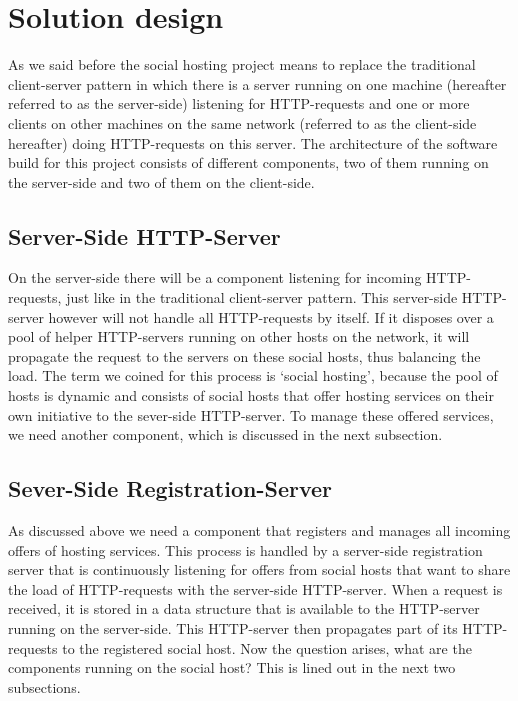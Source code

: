\documentclass[a4paper, 10pt]{article}
\begin{document}
\section{Solution design}

As we said before the social hosting project means to replace the traditional client-server pattern in which there is a server running on one machine (hereafter referred to as the server-side) listening for HTTP-requests and one or more clients on other machines on the same network (referred to as the client-side hereafter) doing HTTP-requests on this server. The architecture of the software build for this project consists of different components, two of them running on the server-side and two of them on the client-side. 

\subsection{Server-Side HTTP-Server}
On the server-side there will be a component listening for incoming HTTP-requests, just like in the traditional client-server pattern. This server-side HTTP-server however will not handle all HTTP-requests by itself. If it disposes over a pool of helper HTTP-servers running on other hosts on the network, it will propagate the request to the servers on these social hosts, thus balancing the load. The term we coined for this process is `social hosting', because the pool of hosts is dynamic and consists of social hosts that offer hosting services on their own initiative to the sever-side HTTP-server. To manage these offered services, we need another component, which is discussed in the next subsection.

\subsection{Sever-Side Registration-Server}
As discussed above we need a component that registers and manages all incoming offers of hosting services. This process is handled by a server-side registration server that is continuously listening for offers from social hosts that want to share the load of HTTP-requests with the server-side HTTP-server. When a request is received, it is stored in a data structure that is available to the HTTP-server running on the server-side. This HTTP-server then propagates part of its HTTP-requests to the registered social host. Now the question arises, what are the components running on the social host? This is lined out in the next two subsections.
\end{document}
